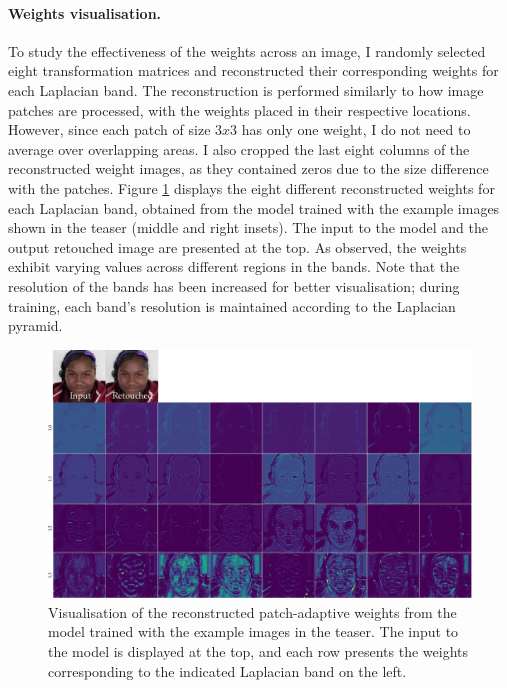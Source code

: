 \paragraph{Weights visualisation.} To study the effectiveness of the weights across an image, I randomly selected eight transformation matrices and reconstructed their corresponding weights for each Laplacian band. The reconstruction is performed similarly to how image patches are processed, with the weights placed in their respective locations. However, since each patch of size $3 x 3$ has only one weight, I do not need to average over overlapping areas. I also cropped the last eight columns of the reconstructed weight images, as they contained zeros due to the size difference with the patches. Figure \ref{fig:weight-vis} displays the eight different reconstructed weights for each Laplacian band, obtained from the model trained with the example images shown in the teaser (middle and right insets). The input to the model and the output retouched image are presented at the top. As observed, the weights exhibit varying values across different regions in the bands. Note that the resolution of the bands has been increased for better visualisation; during training, each band’s resolution is maintained according to the Laplacian pyramid.


\begin{figure}%
\centering
\includegraphics[width=\columnwidth]{Chapters/detail-retouching-figs/weight_visualise.pdf}
    \caption{Visualisation of the reconstructed patch-adaptive weights from the model trained with the example images in the teaser. The input to the model is displayed at the top, and each row presents the weights corresponding to the indicated Laplacian band on the left.}

\label{fig:weight-vis}
\end{figure}


